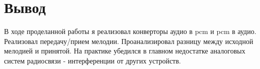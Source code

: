 \chapter{Вывод}
\label{ch:chap3}

В ходе проделанной работы я реализовал конверторы аудио в pcm и pcm в аудио. Реализовал передачу/прием мелодии. Проанализировал разницу между исходной мелодией
и принятой. На практике убедился в главном недостатке аналоговых систем радиосвязи - интерференции от других устройств.

\endinput